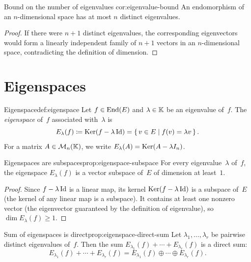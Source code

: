 \begin{corollary}{Bound on the number of eigenvalues}%
{cor:eigenvalue-bound}
An endomorphism of an $n$-dimensional space has at most $n$ distinct
eigenvalues.
\end{corollary}

\begin{proof}
If there were $n+1$ distinct eigenvalues, the corresponding
eigenvectors would form a linearly independent family of $n+1$ vectors
in an $n$-dimensional space, contradicting the definition of dimension.
\end{proof}


\section{Eigenspaces}\label{sec:eigenspaces}

\begin{definition}{Eigenspace}{def:eigenspace}
Let $f\in\operatorname{End}(E)$ and $\lambda\in{\mathbb{K}}$ be an eigenvalue of~$f$.  The
\emph{eigenspace} of~$f$ associated with~$\lambda$ is
\[
  E_\lambda(f) \coloneqq \operatorname{Ker}(f - \lambda\operatorname{Id})
  = \left\{\,v\in E\;\middle|\;f(v) = \lambda v\,\right\}.
\]
For a matrix $A\in\mathcal{M}_n({\mathbb{K}})$, we write $E_\lambda(A) = \operatorname{Ker}(A-\lambda I_n)$.
\end{definition}

\begin{proposition}{Eigenspaces are subspaces}{prop:eigenspace-subspace}
For every eigenvalue~$\lambda$ of~$f$, the eigenspace $E_\lambda(f)$
is a vector subspace of~$E$ of dimension at least~$1$.
\end{proposition}

\begin{proof}
Since $f - \lambda\operatorname{Id}$ is a linear map, its kernel $\operatorname{Ker}(f - \lambda\operatorname{Id})$
is a subspace of~$E$ (the kernel of any linear map is a subspace).
It contains at least one nonzero vector (the eigenvector guaranteed by
the definition of eigenvalue), so $\dim E_\lambda(f) \geq 1$.
\end{proof}

\begin{proposition}{Sum of eigenspaces is direct}{prop:eigenspace-direct-sum}
Let $\lambda_1,\ldots,\lambda_r$ be pairwise distinct eigenvalues
of~$f$.  Then the sum $E_{\lambda_1}(f) + \cdots + E_{\lambda_r}(f)$
is a direct sum:
\[
  E_{\lambda_1}(f) + \cdots + E_{\lambda_r}(f)
  = E_{\lambda_1}(f) \oplus \cdots \oplus E_{\lambda_r}(f).
\]
\end{proposition}

